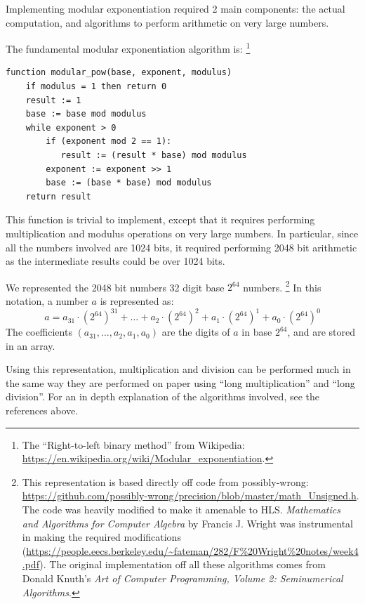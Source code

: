 Implementing modular exponentiation required 2 main components: the actual computation, and algorithms to perform
arithmetic on very large numbers.

The fundamental modular exponentiation algorithm is: \footnote{The ``Right-to-left binary method'' from Wikipedia: \url{https://en.wikipedia.org/wiki/Modular_exponentiation}.}

\begin{verbatim}
function modular_pow(base, exponent, modulus)
    if modulus = 1 then return 0
    result := 1
    base := base mod modulus
    while exponent > 0
        if (exponent mod 2 == 1):
           result := (result * base) mod modulus
        exponent := exponent >> 1
        base := (base * base) mod modulus
    return result
\end{verbatim}

This function is trivial to implement, except that it requires performing multiplication and modulus operations on very large numbers.
In particular, since all the numbers involved are 1024 bits, it required performing 2048 bit arithmetic as the intermediate results
could be over 1024 bits.

We represented the 2048 bit numbers 32 digit base $2^{64}$ numbers. \footnote{This representation is based directly off code from possibly-wrong: \url{https://github.com/possibly-wrong/precision/blob/master/math_Unsigned.h}. The code was heavily modified to make it amenable to HLS. \emph{Mathematics and Algorithms for Computer Algebra} by Francis J. Wright was instrumental in making the required modifications (\url{https://people.eecs.berkeley.edu/~fateman/282/F\%20Wright\%20notes/week4.pdf}). The original implementation off all these algorithms comes from Donald Knuth's \emph{Art of Computer Programming, Volume 2: Seminumerical Algorithms}.}
In this notation, a number $a$ is represented as:
$$a = a_{31} \cdot \left ( 2^{64} \right )^{31} + \ldots + a_{2} \cdot \left ( 2^{64} \right )^{2} + a_{1} \cdot \left ( 2^{64} \right )^{1} + a_{0} \cdot \left ( 2^{64} \right )^{0}$$
The coefficients $\left( a_{31}, \ldots, a_2, a_1, a_0 \right )$ are the digits of $a$ in base $2^{64}$, and are stored in an array.

Using this representation, multiplication and division can be performed much in the same way they are performed on paper using ``long multiplication'' and ``long division''. For an in depth explanation of the algorithms involved, see the references above.


